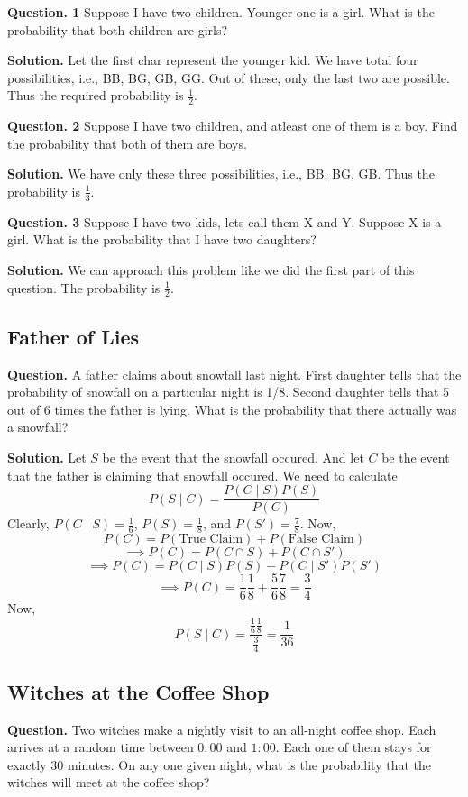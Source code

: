 \textbf{Question. 1} Suppose I have two children. Younger one is a girl. What is the probability that both children are girls?

\textbf{Solution.} Let the first char represent the younger kid. We have total four possibilities, i.e., BB, BG, GB, GG. Out of these, only the last two are possible. Thus the required probability is $\frac{1}{2}$.

\textbf{Question. 2} Suppose I have two children, and atleast one of them is a boy. Find the probability that both of them are boys.

\textbf{Solution.} We have only these three possibilities, i.e., BB, BG, GB. Thus the probability is $\frac{1}{3}$.

\textbf{Question. 3} Suppose I have two kids, lets call them X and Y. Suppose X is a girl. What is the probability that I have two daughters?

\textbf{Solution.} We can approach this problem like we did the first part of this question. The probability is $\frac{1}{2}$.

\subsection{Father of Lies}

\textbf{Question.} A father claims about snowfall last night. First daughter tells that the probability of snowfall on a particular night is 1/8. Second daughter tells that 5 out of 6 times the father is lying. What is the probability that there actually was a snowfall?

\textbf{Solution.}  Let $S$ be the event that the snowfall occured. And let $C$ be the event that the father is claiming that snowfall occured. We need to calculate 
\[P(S\mid C) = \frac{P(C \mid S) P(S)}{P(C)}\]
Clearly, $P(C \mid S) = \frac{1}{6}$, $P(S) = \frac{1}{8}$, and $P(S') = \frac{7}{8}$.
Now, \[P(C) = P(\text{True Claim}) + P(\text{False Claim})\]
\[ \implies P(C) = P(C \cap S) + P(C \cap S')   \]
\[ \implies P(C) = P(C\mid S)P(S) + P(C \mid S')P(S') \]
\[\implies P(C) = \frac{1}{6} \frac{1}{8} + \frac{5}{6} \frac{7}{8} = \frac{3}{4}\]
Now, \[P(S\mid C) = \frac{\frac{1}{6} \frac{1}{8}}{\frac{3}{4}} = \frac{1}{36}\]


\subsection{Witches at the Coffee Shop}

\textbf{Question.} Two witches make a nightly visit to an all-night coffee shop. Each arrives at a random time between $0:00$ and $1:00$. Each one of them stays for exactly $30$ minutes. On any one given night, what is the probability that the witches will meet at the coffee shop?

